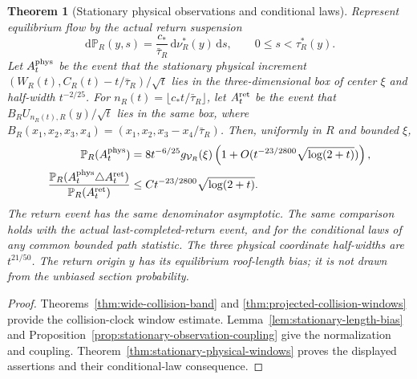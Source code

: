 \documentclass[11pt,reqno]{amsart}
\numberwithin{equation}{section}
\newtheorem{maintheorem}{Theorem}
\theoremstyle{definition}\newtheorem{definition}[theorem]{Definition}
\theoremstyle{remark}\newtheorem{remark}[theorem]{Remark}
\newcommand{\dd}{\,\mathrm d}\newcommand{\one}{\mathbf1}
\begin{document}
\begin{maintheorem}[Stationary physical observations and conditional laws]
\label{thm:intro-stationary-physical-windows}
Represent equilibrium flow by the actual return suspension
\[
 \dd\mathbb P_R(y,s)=\frac{c_*}{\bar\tau_R}\dd\nu_R^*(y)\dd s,
 \qquad 0\le s<\tau_R^*(y).
\]
Let $A_t^{\rm phys}$ be the event that the stationary physical
increment $(W_R(t),C_R(t)-t/\bar\tau_R)/\sqrt t$ lies in the
three-dimensional box of center $\xi$ and half-width $t^{-2/25}$.
For $n_R(t)=\lfloor c_*t/\bar\tau_R\rfloor$, let $A_t^{\rm ret}$
be the event that $B_RU_{n_R(t),R}(y)/\sqrt t$ lies in the same box,
where $B_R(x_1,x_2,x_3,x_4)=(x_1,x_2,x_3-x_4/\bar\tau_R)$.
Then, uniformly in $R$ and bounded $\xi$,
\begin{align*}
 \mathbb P_R(A_t^{\rm phys})
 &=8t^{-6/25}g_{\mathcal V_R}(\xi)
       \left(1+O(t^{-23/2800}\sqrt{\log(2+t)})\right),\\
 \frac{\mathbb P_R(A_t^{\rm phys}\triangle A_t^{\rm ret})}
             {\mathbb P_R(A_t^{\rm ret})}
 &\le C t^{-23/2800}\sqrt{\log(2+t)}.
\end{align*}
The return event has the same denominator asymptotic. The same
comparison holds with the actual last-completed-return event, and
for the conditional laws of any common bounded path statistic.
The three physical coordinate half-widths are $t^{21/50}$.
The return origin $y$ has its equilibrium roof-length bias; it is
not drawn from the unbiased section probability.
\end{maintheorem}
\begin{proof}
Theorems~\ref{thm:wide-collision-band} and
\ref{thm:projected-collision-windows} provide the collision-clock
window estimate. Lemma~\ref{lem:stationary-length-bias} and
Proposition~\ref{prop:stationary-observation-coupling} give the
normalization and coupling. Theorem~\ref{thm:stationary-physical-windows}
proves the displayed assertions and their conditional-law consequence.
\end{proof}
\end{document}

